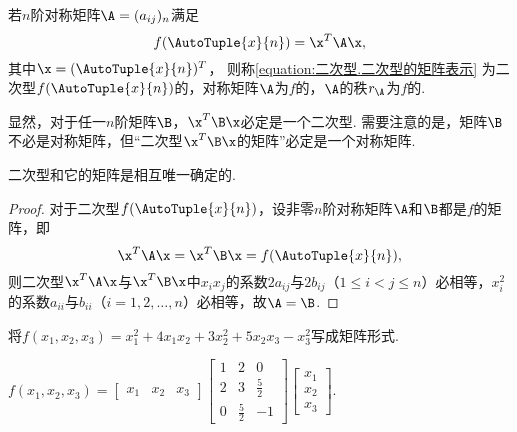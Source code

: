 \begin{definition}
若\(n\)阶对称矩阵\(\A = (a_{ij})_n\)满足
\begin{equation}\label{equation:二次型.二次型的矩阵表示}
f(\AutoTuple{x}{n}) = \x^T\A\x,
\end{equation}其中\(\x = (\AutoTuple{x}{n})^T\)，%
则称\cref{equation:二次型.二次型的矩阵表示} 为二次型\(f(\AutoTuple{x}{n})\)的，对称矩阵\(\A\)为\(f\)的，\(\A\)的秩\(r_{\A}\)为\(f\)的.
\end{definition}

显然，对于任一\(n\)阶矩阵\(\B\)，\(\x^T\B\x\)必定是一个二次型.
需要注意的是，矩阵\(\B\)不必是对称矩阵，但“二次型\(\x^T\B\x\)的矩阵”必定是一个对称矩阵.

\begin{property}
二次型和它的矩阵是相互唯一确定的.
\begin{proof}
对于二次型\(f(\AutoTuple{x}{n})\)，设非零\(n\)阶对称矩阵\(\A\)和\(\B\)都是\(f\)的矩阵，即\[
\x^T\A\x
=\x^T\B\x
=f(\AutoTuple{x}{n}),
\]则二次型\(\x^T\A\x\)与\(\x^T\B\x\)中\(x_i x_j\)的系数\(2 a_{ij}\)与\(2 b_{ij}\)（\(1 \leqslant i < j \leqslant n\)）必相等，\(x_i^2\)的系数\(a_{ii}\)与\(b_{ii}\)（\(i=1,2,\dotsc,n\)）必相等，故\(\A=\B\).
\end{proof}
\end{property}

\begin{example}
将\(f(x_1,x_2,x_3) = x_1^2 + 4 x_1 x_2 + 3 x_2^2 + 5 x_2 x_3 - x_3^2\)写成矩阵形式.
\begin{solution}
\(f(x_1,x_2,x_3) = \begin{bmatrix}
x_1 & x_2 & x_3
\end{bmatrix} \begin{bmatrix}
1 & 2 & 0 \\
2 & 3 & \frac{5}{2} \\
0 & \frac{5}{2} & -1
\end{bmatrix} \begin{bmatrix}
x_1 \\ x_2 \\ x_3
\end{bmatrix}\).
\end{solution}
\end{example}


